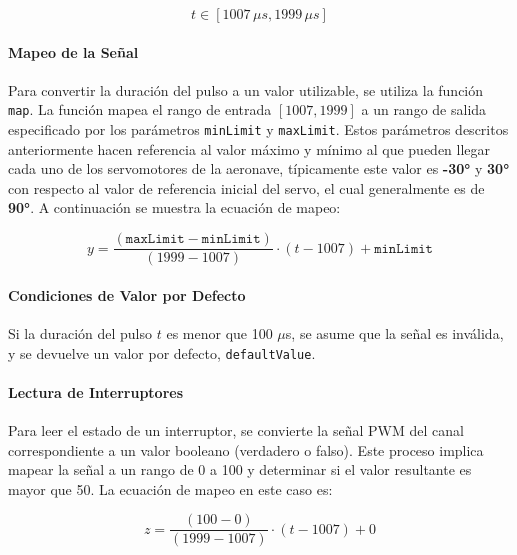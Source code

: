 \begin{equation*}
t \in [1007 \, \mu s, 1999 \, \mu s]
\end{equation*}
\vspace{5 px}
\paragraph{\textbf{Mapeo de la Señal}}
\vspace{5 px}
Para convertir la duración del pulso a un valor utilizable, se utiliza la función \texttt{map}. La función mapea el rango de entrada \([1007, 1999]\) a un rango de salida especificado por los parámetros \texttt{minLimit} y \texttt{maxLimit}. Estos parámetros descritos anteriormente hacen referencia al valor máximo y mínimo al que pueden llegar cada uno de los servomotores de la aeronave, típicamente este valor es \textbf{-30°} y \textbf{30°} con respecto al valor de referencia inicial del servo, el cual generalmente es de \textbf{90°}. A continuación se muestra la ecuación de mapeo:


\begin{equation*}
y = \frac{(\texttt{maxLimit} - \texttt{minLimit})}{(1999 - 1007)} \cdot (t - 1007) + \texttt{minLimit}
\end{equation*}
\vspace{5 px}
\paragraph{\textbf{Condiciones de Valor por Defecto}}
\vspace{5 px}
Si la duración del pulso \( t \) es menor que 100 $\mu$s, se asume que la señal es inválida, y se devuelve un valor por defecto, \texttt{defaultValue}.
\vspace{5 px}
\paragraph{\textbf{Lectura de Interruptores}}
\vspace{5 px}
Para leer el estado de un interruptor, se convierte la señal PWM del canal correspondiente a un valor booleano (verdadero o falso). Este proceso implica mapear la señal a un rango de 0 a 100 y determinar si el valor resultante es mayor que 50. La ecuación de mapeo en este caso es:

\begin{equation}
z = \frac{(100 - 0)}{(1999 - 1007)} \cdot (t - 1007) + 0
\end{equation}

